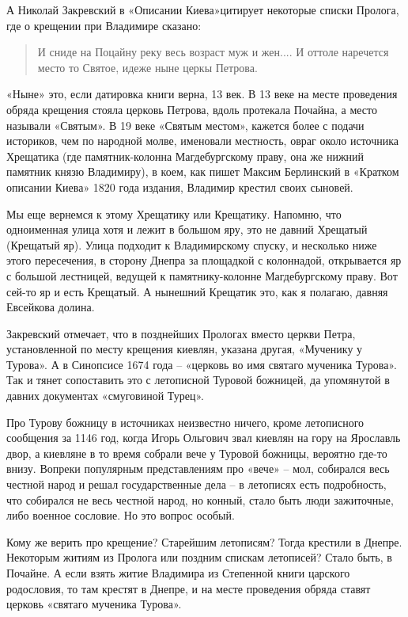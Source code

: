 А Николай Закревский в «Описании Киева»\cite{zakr01}цити\-рует некоторые списки Пролога, где о крещении при Владимире сказано:

\begin{quotation}
И сниде на Поцайну реку весь возраст муж и жен.... И оттоле наречется место то Святое, идеже ныне церкы Петрова.
\end{quotation}

«Ныне» это, если датировка книги верна, 13 век. В 13 веке на месте проведения обряда крещения стояла церковь Петрова, вдоль протекала Почайна, а место называли «Святым». В 19 веке «Святым местом», кажется более с подачи историков, чем по народной молве, именовали местность, овраг около источника Хрещатика (где памятник-колонна Магдебургскому праву, она же нижний памятник князю Владимиру), в коем, как пишет Максим Берлинский в «Кратком описании Киева» 1820 года издания\cite{berl01}, Владимир крестил своих сыновей.

Мы еще вернемся к этому Хрещатику или Крещатику. Напомню, что одноименная улица хотя и лежит в большом яру, это не давний Хрещатый (Крещатый яр). Улица подходит к Владимирскому спуску, и несколько ниже этого пересечения, в сторону Днепра за площадкой с колоннадой, открывается яр с большой лестницей, ведущей к памятнику-колонне Магдебургскому праву. Вот сей-то яр и есть Крещатый. А нынешний Крещатик это, как я полагаю, давняя Евсейкова долина.

Закревский отмечает, что в позднейших Прологах вместо церкви Петра, установленной по месту крещения киевлян, указана другая, «Мученику у Турова». А в Синопсисе 1674 года – «церковь во имя святаго мученика Турова». Так и тянет сопоставить это с летописной Туровой божницей, да упомянутой в давних документах «смуговиной Турец».

Про Турову божницу в источниках неизвестно ничего, кроме летописного сообщения за 1146 год, когда Игорь Ольгович звал киевлян на гору на Ярославль двор, а киевляне в то время собрали вече у Туровой божницы, вероятно где-то внизу. Вопреки популярным представлениям про «вече» – мол, собирался весь честной народ и решал государственные дела – в летописях есть подробность, что собирался не весь честной народ, но конный, стало быть люди зажиточные, либо военное сословие. Но это вопрос особый.

Кому же верить про крещение? Старейшим летописям? Тогда крестили в Днепре. Некоторым житиям из Пролога или поздним спискам летописей? Стало быть, в Почайне. А если взять житие Владимира из Степенной книги царского родословия, то там крестят в Днепре, и на месте проведения обряда ставят церковь «святаго мученика Турова».

